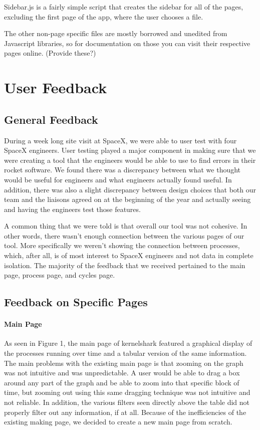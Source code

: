 \documentclass{hmcclinic}
\begin{document}
  Sidebar.js is a fairly simple script that creates the sidebar for all of the
  pages, excluding the first page of the app, where the user chooses a file.

  The other non-page specific files are mostly borrowed and unedited from
  Javascript libraries, so for documentation on those you can visit their
  respective pages online. (Provide these?)

\chapter{User Feedback} %
\section{General Feedback} %
During a week long site visit at SpaceX, we were able to user test with four SpaceX engineers. User testing played a major component in making sure that we were creating a tool that the engineers would be able to use to find errors in their rocket software. We found there was a discrepancy between what we thought would be useful for engineers and what engineers actually found useful. In addition, there was also a slight discrepancy between design choices that both our team and the liaisons agreed on at the beginning of the year and actually seeing and having the engineers test those features.

A common thing that we were told is that overall our tool was not cohesive. In other words, there wasn't enough connection between the various pages of our tool. More specifically we weren't showing the connection between processes, which, after all, is of most interest to SpaceX engineers and not data in complete isolation. The majority of the feedback that we received pertained to the main page, process page, and cycles page.

\section{Feedback on Specific Pages} %

\subsubsection{Main Page}

As seen in Figure 1, the main page of kernelshark featured a graphical display of the processes running over time and a tabular version of the same information. The main problems with the existing main page is that zooming on the graph was not intuitive and was unpredictable. A user would be able to drag a box around any part of the graph and be able to zoom into that specific block of time, but zooming out using this same dragging technique was not intuitive and not reliable. In addition, the various filters seen directly above the table did not properly filter out any information, if at all. Because of the inefficiencies of the existing making page, we decided to create a new main page from scratch. 
\end{document}
